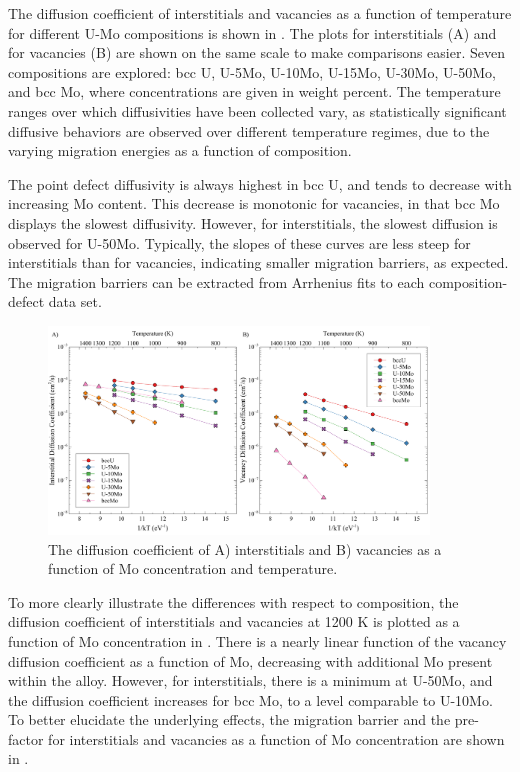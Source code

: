 \documentclass[review]{elsarticle}
\begin{document}
The diffusion coefficient of interstitials and vacancies as a function of temperature for different U-Mo compositions is shown in . The plots for interstitials (A) and for vacancies (B) are shown on the same scale to make comparisons easier. Seven compositions are explored: bcc U, U-5Mo, U-10Mo, U-15Mo, U-30Mo, U-50Mo, and bcc Mo, where concentrations are given in weight percent. The temperature ranges over which diffusivities have been collected vary, as statistically significant diffusive behaviors are observed over different temperature regimes, due to the varying migration energies as a function of composition. 

The point defect diffusivity is always highest in bcc U, and tends to decrease with increasing Mo content. This decrease is monotonic for vacancies, in that bcc Mo displays the slowest diffusivity. However, for interstitials, the slowest diffusion is observed for U-50Mo. Typically, the slopes of these curves are less steep for interstitials than for vacancies, indicating smaller migration barriers, as expected. The migration barriers can be extracted from Arrhenius fits to each composition-defect data set. 

\begin{figure}[h!]
    \centering
    \includegraphics[width=0.9\textwidth]{diff_p0.pdf}
    \caption{The diffusion coefficient of A) interstitials and B) vacancies as a function of Mo concentration and temperature.}
    \label{fig:diff_p0}
\end{figure}

To more clearly illustrate the differences with respect to composition, the diffusion coefficient of interstitials and vacancies at 1200 K is plotted as a function of Mo concentration in . There is a nearly linear function of the vacancy diffusion coefficient as a function of Mo, decreasing with additional Mo present within the alloy. However, for interstitials, there is a minimum at U-50Mo, and the diffusion coefficient increases for bcc Mo, to a level comparable to U-10Mo. To better elucidate the underlying effects, the migration barrier and the pre-factor for interstitials and vacancies as a function of Mo concentration are shown in . 
\end{document}
